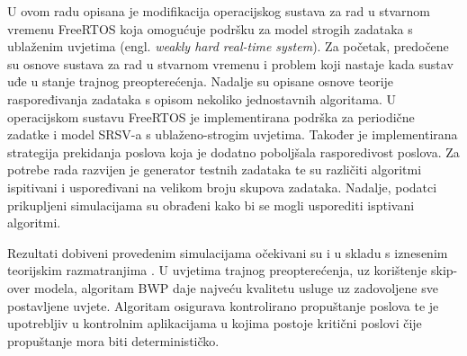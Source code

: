 \documentclass[../zavrsni.tex]{subfiles}
\begin{document}
\sloppy

\justifying

U ovom radu opisana je modifikacija operacijskog sustava za rad u stvarnom vremenu FreeRTOS koja omogućuje podršku za model strogih zadataka s ublaženim uvjetima (engl. \textit{weakly hard real-time system}). Za početak, predočene su osnove sustava za 
rad u stvarnom vremenu i problem koji nastaje kada sustav uđe u stanje trajnog preopterećenja. Nadalje su opisane osnove teorije raspoređivanja 
zadataka s opisom nekoliko jednostavnih algoritama. 
U operacijskom sustavu FreeRTOS je implementirana podrška za periodične zadatke i model SRSV-a s ublaženo-strogim uvjetima.
Također je implementirana strategija prekidanja poslova koja je dodatno poboljšala rasporedivost poslova.
Za potrebe rada razvijen je generator testnih zadataka te su različiti algoritmi ispitivani i uspoređivani na velikom broju skupova zadataka.
Nadalje, podatci prikupljeni simulacijama su obrađeni kako bi se mogli usporediti isptivani algoritmi.

Rezultati dobiveni provedenim simulacijama očekivani su i u skladu s iznesenim teorijskim razmatranjima \cite{knjiga_buttazzo}. U uvjetima trajnog preopterećenja, uz korištenje skip-over modela,  
algoritam BWP daje najveću kvalitetu usluge uz zadovoljene sve postavljene uvjete. Algoritam osigurava kontrolirano propuštanje poslova te je upotrebljiv 
u kontrolnim aplikacijama u kojima postoje kritični poslovi čije propuštanje mora biti determinističko.
\end{document}
